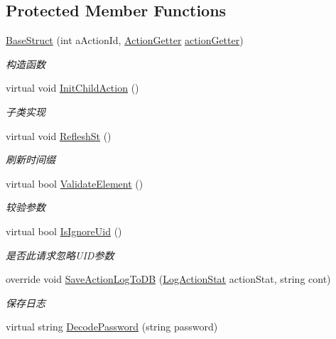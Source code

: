 \subsection*{Protected Member Functions}
\begin{DoxyCompactItemize}
\item 
\mbox{\hyperlink{class_t_net_1_1_service_1_1_base_struct_a7d2af70a22df08f708c9707a205f1161}{Base\+Struct}} (int a\+Action\+Id, \mbox{\hyperlink{class_t_net_1_1_service_1_1_action_getter}{Action\+Getter}} \mbox{\hyperlink{class_t_net_1_1_service_1_1_game_struct_a14dcf224eb5a73e2c0b3bee4fe359dd8}{action\+Getter}})
\begin{DoxyCompactList}\small\item\em 构造函数 \end{DoxyCompactList}\item 
virtual void \mbox{\hyperlink{class_t_net_1_1_service_1_1_base_struct_ad2af7304687799ec4a7fe2036643d407}{Init\+Child\+Action}} ()
\begin{DoxyCompactList}\small\item\em 子类实现 \end{DoxyCompactList}\item 
virtual void \mbox{\hyperlink{class_t_net_1_1_service_1_1_base_struct_ae25296bf13a95d5f8a2b94c345d18ae6}{Reflesh\+St}} ()
\begin{DoxyCompactList}\small\item\em 刷新时间缀 \end{DoxyCompactList}\item 
virtual bool \mbox{\hyperlink{class_t_net_1_1_service_1_1_base_struct_aed62419eda78ee2f769be582f02025e8}{Validate\+Element}} ()
\begin{DoxyCompactList}\small\item\em 较验参数 \end{DoxyCompactList}\item 
virtual bool \mbox{\hyperlink{class_t_net_1_1_service_1_1_base_struct_ad113e67255dd3c3c625903fc746266b3}{Is\+Ignore\+Uid}} ()
\begin{DoxyCompactList}\small\item\em 是否此请求忽略\+U\+I\+D参数 \end{DoxyCompactList}\item 
override void \mbox{\hyperlink{class_t_net_1_1_service_1_1_base_struct_ad194547c2bd8ffe7e438af37457b011a}{Save\+Action\+Log\+To\+DB}} (\mbox{\hyperlink{class_t_net_1_1_service_1_1_game_struct_ac7fb463ce72bdf0b12b015c74d2d58da}{Log\+Action\+Stat}} action\+Stat, string cont)
\begin{DoxyCompactList}\small\item\em 保存日志 \end{DoxyCompactList}\item 
virtual string \mbox{\hyperlink{class_t_net_1_1_service_1_1_base_struct_a2ddf77dd978a1a2d5885a9ec44d5a384}{Decode\+Password}} (string password)
\end{DoxyCompactItemize}
